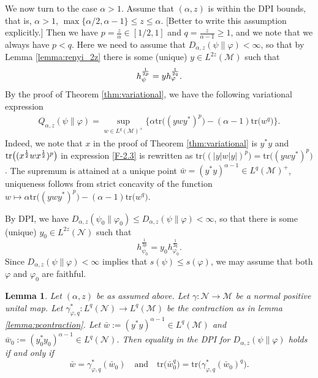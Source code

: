 \documentclass[12pt]{article}
\newtheorem{lemma}[theorem]{Lemma}
\theoremstyle{definition}
\theoremstyle{remark}
\numberwithin{equation}{section}
\def\Me{\mathcal M}
\def\Ne{\mathcal N}
\def\Tr{\mathrm{tr}}
\def\ffi{\varphi}
\begin{document}
We now turn to the case $\alpha>1$. {Assume that $(\alpha,z)$ is within the DPI bounds,
that is, $\alpha>1$, $\max\{\alpha/2,\alpha-1\}\le z\le\alpha$. [Better to write this assumption explicitly.] Then}
we have $p=\frac z\alpha\in [1/2,1]$ and $q=\frac z{\alpha-1}\ge 1$, and we note that we always have $p<q$.
Here we need to assume that $D_{\alpha,z}(\psi\|\ffi)<\infty$, so that by Lemma \ref{lemma:renyi_2z}
there is some (unique) $y\in L^{2z}(\Me)$ such that
\[
h_{\psi}^{1\over 2p}=y h_\ffi^{1\over 2q}.
\]
By the proof of Theorem \ref{thm:variational}, we have the following variational expression
\begin{align}\label{eq:variationalq}
Q_{\alpha,z}(\psi\|\varphi) =\sup_{w\in
L^q(\Me)^+}\bigl\{\alpha\Tr\bigl((ywy^*)^p\bigr)-(\alpha-1)\Tr\bigl(w^q\bigr)\bigr\}.
\end{align}
{Indeed, we note that $x$ in the proof of Theorem \ref{thm:variational} is $y^*y$ and
$\Tr\bigl((x^{1\over2}wx^{1\over2})^p\bigr)$ in expression \eqref{F-2.3} is rewritten as
$\Tr\bigl((|y|w|y|)^p\bigr)=\Tr\bigl((ywy^*)^p\bigr)$.}
The supremum is attained at a unique point $\bar
w=(y^*y)^{\alpha-1}\in L^q(\Me)^+$, uniqueness follows from strict concavity of the
function $w\mapsto \alpha\Tr\bigl((ywy^*)^p\bigr)-(\alpha-1)\Tr\bigl( w^q\bigr)$.


By DPI, we have $D_{\alpha,z}(\psi_0\|\varphi_0)\le D_{\alpha,z}(\psi\|\varphi)<\infty$,
so that there is some (unique) $y_0\in L^{2z}(\Ne)$ such that 
\[
h_{\psi_0}^{\frac1{2p}}=y_0h_{\varphi_0}^{\frac1{2q}}.
\]
Since $D_{\alpha,z}(\psi\|\ffi)<\infty$ implies that $s(\psi)\le s(\ffi)$, we may assume that both $\ffi$ and
$\ffi_0$ are faithful.


\begin{lemma}\label{lemma:le}
{Let $(\alpha,z)$ be as assumed above.} Let $\gamma:\Ne\to\Me$ be a normal positive unital map. 
Let $\gamma^*_{\ffi,q}:L^q(\Ne)\to L^q(\Me)$ be the contraction as in lemma \ref{lemma:pcontraction}. 
Let $\bar w:=(y^*y)^{\alpha-1}\in L^q(\Me)$ and $\bar w_0:=(y_0^*y_0)^{\alpha-1}\in
L^q(\Ne)$. Then equality in the DPI for $D_{\alpha,z}(\psi\|\ffi)$ holds if and only if
\begin{equation}\label{eq:dpiw}
\bar w=\gamma^*_{\ffi,q}(\bar w_0)\quad \text{and}\quad  
\Tr\bigl(\bar w_0^q\bigr)=\Tr\bigl(\gamma^*_{\varphi,q}(\bar w_0)^q\bigr).
\end{equation}
\end{lemma}
\end{document}
